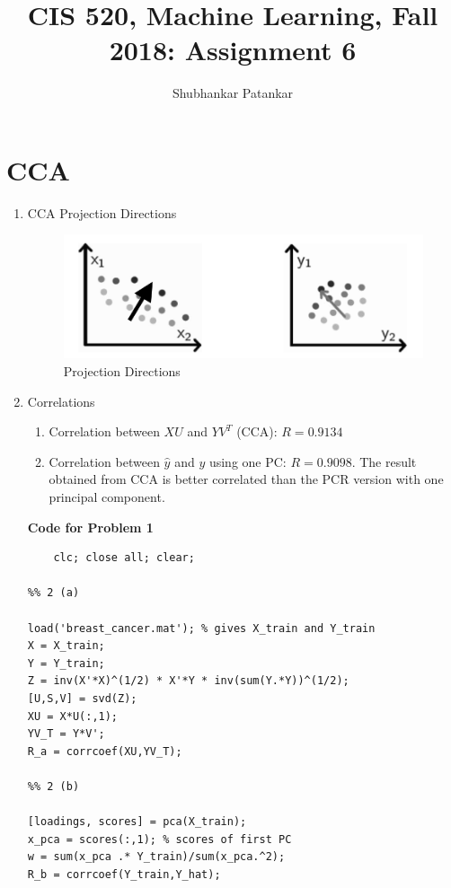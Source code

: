 \documentclass[english]{article}
\title{CIS 520, Machine Learning, Fall 2018: Assignment 6}
\author{Shubhankar Patankar}
\begin{document}
\maketitle

\newpage

\section{CCA}
\begin{enumerate}
    \item CCA Projection Directions
    \begin{figure}[H]
    \centering
    \includegraphics[scale = 0.5]{1_a}
    \caption{Projection Directions}
    \label{fig:1_a}
    \end{figure}
    \item Correlations
        \begin{enumerate}
        \item Correlation between $XU$ and $YV^T$ (CCA): $R = 0.9134$
        \item Correlation between $\hat{y}$ and $y$ using one PC: $R = 0.9098$. The result obtained from CCA is better correlated than the PCR version with one principal component.  
    \end{enumerate}
    	\textbf{Code for Problem 1}
	\color{black}
    	\begin{verbatim}
	clc; close all; clear;

%% 2 (a)

load('breast_cancer.mat'); % gives X_train and Y_train
X = X_train;
Y = Y_train;
Z = inv(X'*X)^(1/2) * X'*Y * inv(sum(Y.*Y))^(1/2);
[U,S,V] = svd(Z);
XU = X*U(:,1);
YV_T = Y*V';
R_a = corrcoef(XU,YV_T);

%% 2 (b)

[loadings, scores] = pca(X_train);
x_pca = scores(:,1); % scores of first PC
w = sum(x_pca .* Y_train)/sum(x_pca.^2);
R_b = corrcoef(Y_train,Y_hat);
	\end{verbatim}
\end{enumerate}
\newpage
\end{document}
